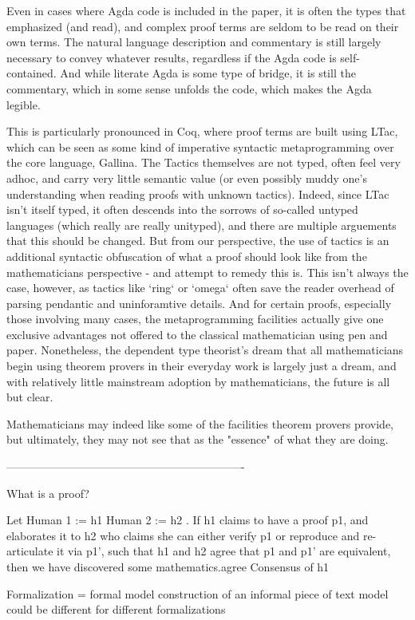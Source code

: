 Even in cases where Agda code is included in the paper, it is often the types
that emphasized (and read), and complex proof terms are seldom to be read on
their own terms. The natural language description and commentary is still
largely necessary to convey whatever results, regardless if the Agda code is
self-contained. And while literate Agda is some type of bridge, it is still the
commentary, which in some sense unfolds the code, which makes the Agda legible.

This is particularly pronounced in Coq, where proof terms are built using LTac,
which can be seen as some kind of imperative syntactic metaprogramming over the
core language, Gallina. The Tactics themselves are not typed, often feel very
adhoc, and carry very little semantic value (or even possibly muddy one's
understanding when reading proofs with unknown tactics). Indeed, since LTac
isn't itself typed, it often descends into the sorrows of so-called untyped
languages (which really are really unityped), and there are multiple arguements
that this should be changed. But from our perspective, the use of tactics is an
additional syntactic obfuscation of what a proof should look like from the
mathematicians perspective - and attempt to remedy this is. This isn't always
the case, however, as tactics like `ring` or `omega` often save the reader
overhead of parsing pendantic and uninforamtive details. And for certain proofs,
especially those involving many cases, the metaprogramming facilities actually
give one exclusive advantages not offered to the classical mathematician using
pen and paper. Nonetheless, the dependent type theorist's dream that all
mathematicians begin using theorem provers in their everyday work is largely
just a dream, and with relatively little mainstream adoption by mathematicians,
the future is all but clear.

Mathematicians may indeed like some of the facilities theorem provers provide,
but ultimately, they may not see that as the "essence" of what they are doing.

----------------------------------------------------------------

What is a proof? 

Let
Human 1 := h1
Human 2 := h2
. If h1 claims to have a proof p1, and elaborates it to h2 who claims she can
either verify p1 or 
reproduce and re-articulate it via p1', such that h1 and h2 agree that p1 and
p1' are equivalent, then we have discovered some mathematics.agree Consensus of h1


  Formalization = formal model construction of an informal piece of text
  model could be different for different formalizations

